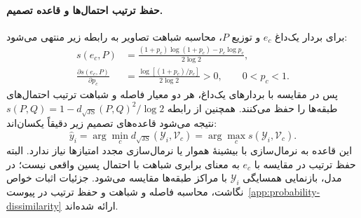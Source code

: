 \paragraph{حفظ ترتیب احتمال‌ها و قاعده تصمیم.}
برای بردار یک‌داغ $e_c$ و توزیع $P$، محاسبه شباهت تصاویر به رابطه زیر منتهی می‌شود:
\begin{equation}\label{cmp:eq:ch3-js-onehot-order}
\begin{aligned}
s(e_c,P)
&=\frac{(1+p_c)\log(1+p_c)-p_c\log p_c}{2\log2},\\[4pt]
\frac{\partial s(e_c,P)}{\partial p_c}
&=\frac{\log[(1+p_c)/p_c]}{2\log2}>0,
\qquad 0<p_c<1.
\end{aligned}
\end{equation}
پس در مقایسه با بردارهای یک‌داغ، هر دو معیار فاصله و شباهت ترتیب احتمال‌های طبقه‌ها را حفظ می‌کنند. همچنین از رابطه $s(P,Q)=1-d_{\sqrt{\mathrm{JS}}}(P,Q)^2/\log2$ نتیجه می‌شود قاعده‌های تصمیم زیر دقیقاً یکسان‌اند:
\begin{equation}\label{cmp:eq:ch3-js-decision}
\boxed{
\widehat y_i
=\arg\min_c d_{\sqrt{\mathrm{JS}}}(\mathscr Y_i,\mathcal V_c)
=\arg\max_c s(\mathscr Y_i,\mathcal V_c).
}
\end{equation}
این قاعده به نرمال‌سازی با بیشینهٔ هموار یا نرمال‌سازی مجدد امتیازها نیاز ندارد. البته حفظ ترتیب در مقایسه با $e_c$ به معنای برابری شباهت با احتمال پسین واقعی نیست؛ در مدل، بازنمایی همسایگی $\mathscr Y_i$ با مراکز طبقه‌ها مقایسه می‌شود. جزئیات اثبات خواص نگاشت، محاسبه فاصله و شباهت و حفظ ترتیب در پیوست~\ref{app:probability-dissimilarity} ارائه شده‌اند.

